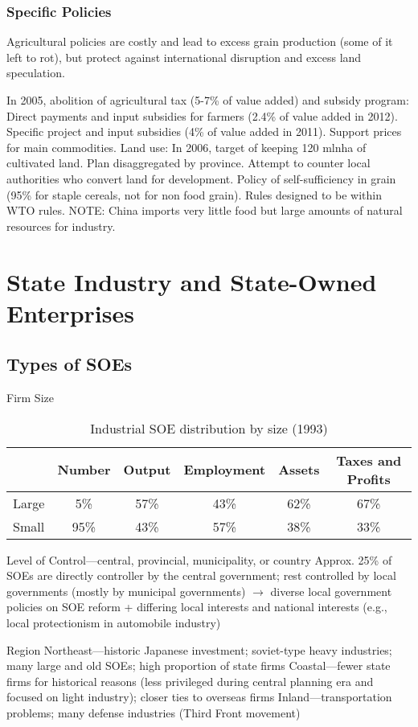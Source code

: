 \documentclass[11pt]{article}
\theoremstyle{definition}
\theoremstyle{remark}
\begin{document}
\subsubsection{Specific Policies}
Agricultural policies are costly and lead to excess grain production (some of it left to rot), but protect against international disruption and excess land speculation.
\begin{outline}[enumerate]
\1 In 2005, abolition of agricultural tax (5-7\% of value added) and subsidy program:
	\2 Direct payments and input subsidies for farmers (2.4\% of value added in 2012).
	\2 Specific project and input subsidies (4\% of value added in 2011).
	\2 Support prices for main commodities.
\1 Land use: In 2006, target of keeping 120 mlnha of cultivated land. Plan disaggregated by province. Attempt to counter local authorities who convert land for development.
\1 Policy of self-sufficiency in grain (95\% for staple cereals, not for non food grain). Rules designed to be within WTO rules.
	\2 NOTE: China imports very little food but large amounts of natural resources for industry.
\end{outline}
\clearpage

\section{State Industry and State-Owned Enterprises}

\subsection{Types of SOEs}
\begin{outline}[enumerate]
\1 Firm Size
\begin{table}[ht]
\centering
\caption{Industrial SOE distribution by size (1993)}
\begin{tabular}[t]{lccccc}
\toprule
&Number&Output&Employment&Assets&Taxes and Profits\\
\midrule
Large & 5\% & 57\% & 43\% & 62\% & 67\%\\
Small & 95\% & 43\% & 57\% & 38\% & 33\%\\
\bottomrule
\end{tabular}
\end{table}%

\1 Level of Control---central, provincial, municipality, or country
	\2 Approx. 25\% of SOEs are directly controller by the central government; rest controlled by local governments (mostly by municipal governments) $\to$ diverse local government policies on SOE reform + differing local interests and national interests (e.g., local protectionism in automobile industry)

\1 Region
	\2 Northeast---historic Japanese investment; soviet-type heavy industries; many large and old SOEs; high proportion of state firms
	\2 Coastal---fewer state firms for historical reasons (less privileged during central planning era and focused on light industry); closer ties to overseas firms
	\2 Inland---transportation problems; many defense industries (Third Front movement)
\end{outline}
\end{document}
